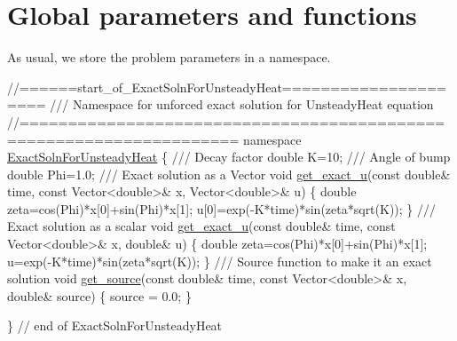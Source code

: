  

\hypertarget{index_namespace}{}\section{Global parameters and functions}\label{index_namespace}
As usual, we store the problem parameters in a namespace.

 
\begin{DoxyCodeInclude}
\textcolor{comment}{//======start\_of\_ExactSolnForUnsteadyHeat=====================}
\textcolor{comment}{/// Namespace for unforced exact solution for UnsteadyHeat equation }
\textcolor{comment}{}\textcolor{comment}{//====================================================================}
\textcolor{keyword}{namespace }\hyperlink{namespaceExactSolnForUnsteadyHeat}{ExactSolnForUnsteadyHeat}
\{
\textcolor{comment}{}
\textcolor{comment}{ /// Decay factor}
\textcolor{comment}{} \textcolor{keywordtype}{double} K=10;
\textcolor{comment}{}
\textcolor{comment}{ /// Angle of bump}
\textcolor{comment}{} \textcolor{keywordtype}{double} Phi=1.0; 
 \textcolor{comment}{}
\textcolor{comment}{ /// Exact solution as a Vector}
\textcolor{comment}{} \textcolor{keywordtype}{void} \hyperlink{namespaceExactSolnForUnsteadyHeat_a1d5b22857bd2a7825397daf1cf9c89eb}{get\_exact\_u}(\textcolor{keyword}{const} \textcolor{keywordtype}{double}& time, \textcolor{keyword}{const} Vector<double>& x, 
                  Vector<double>& u)
 \{
  \textcolor{keywordtype}{double} zeta=cos(Phi)*x[0]+sin(Phi)*x[1];
  u[0]=exp(-K*time)*sin(zeta*sqrt(K));
 \}
 \textcolor{comment}{}
\textcolor{comment}{ /// Exact solution as a scalar}
\textcolor{comment}{} \textcolor{keywordtype}{void} \hyperlink{namespaceExactSolnForUnsteadyHeat_a1d5b22857bd2a7825397daf1cf9c89eb}{get\_exact\_u}(\textcolor{keyword}{const} \textcolor{keywordtype}{double}& time, \textcolor{keyword}{const} Vector<double>& x, \textcolor{keywordtype}{double}& u)
 \{
  \textcolor{keywordtype}{double} zeta=cos(Phi)*x[0]+sin(Phi)*x[1];
  u=exp(-K*time)*sin(zeta*sqrt(K));
 \}
 \textcolor{comment}{}
\textcolor{comment}{ /// Source function to make it an exact solution }
\textcolor{comment}{} \textcolor{keywordtype}{void} \hyperlink{namespaceExactSolnForUnsteadyHeat_ab4e853d6368b1fcdbd6205079687455a}{get\_source}(\textcolor{keyword}{const} \textcolor{keywordtype}{double}& time, \textcolor{keyword}{const} Vector<double>& x, \textcolor{keywordtype}{double}& source)
 \{
  source = 0.0;
 \}

\} \textcolor{comment}{// end of ExactSolnForUnsteadyHeat}

\end{DoxyCodeInclude}




